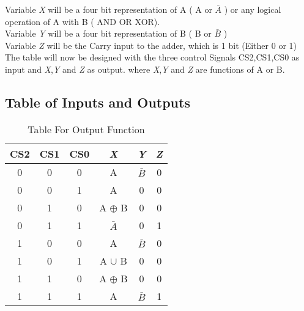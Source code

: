 \documentclass[12pt]{article}
\begin{document}
Variable \textit{X} will be a four bit representation of A ( A or $\bar{A}$ ) or any logical operation of A with B ( AND OR XOR). \\

Variable \textit{Y} will be a four bit representation of B ( B or $\bar{B}$ )\\

Variable \textit{Z} will be the Carry input to the adder, which is 1 bit (Either 0 or 1) \\

The table will now be designed with the three control Signals CS2,CS1,CS0 as input and \textit{X},\textit{Y} and \textit{Z} as output. where \textit{X},\textit{Y} and \textit{Z} are functions of A or B.\\

\subsection{Table of Inputs and Outputs}


\begin{table}[H]

    \centering
    \begin{adjustbox}{width =.6 \textwidth}
    
    \begin{tabular}{|c c c|c|c|c|}
    \hline
    CS2 & CS1 & CS0 & \textit{X} & \textit{Y} & \textit{Z}\\

    \hline

    0 & 0 & 0 & A & $\bar{B}$ & 0\\

    0 & 0 & 1 & A & 0 & 0\\

    0 & 1 & 0 & A $\oplus$ B & 0 & 0\\

    0 & 1 & 1 & $\bar{A}$ & 0 & 1\\

    1 & 0 & 0 & A & $\bar{B}$ & 0\\
    
    1 & 0 & 1 & A $\cup$ B & 0 & 0\\

    1 & 1 & 0 & A $\oplus$ B & 0 & 0\\
    
    1 & 1 & 1 & A & $\bar{B}$ & 1\\

    \hline
    
    \end{tabular}
    
    \end{adjustbox}
    \caption{Table For Output Function}
    \label{tab:IOtable}
\end{table} 
\end{document}
